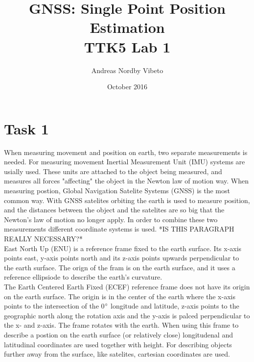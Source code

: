 \documentclass{article}
\title{GNSS: Single Point Position Estimation \\
	   \normalsize{TTK5 Lab 1}}
\author{Andreas Nordby Vibeto}
\date{October 2016}
\begin{document}
\maketitle

\section*{Task 1}

When measuring movement and position on earth, two separate measurements is needed. For measuring movement Inertial Measurement Unit (IMU) systems are usially used. These units are attached to the object being measured, and measures all forces "affecting" the object in the Newton law of motion way. When measuring postion, Global Navigation Satelite Systems (GNSS) is the most common way. With GNSS satelites orbiting the earth is used to measure position, and the distances between the object and the satelites are so big that the Newton's law of motion no longer apply. In order to combine these two measurements different coordinate systems is used. *IS THIS PARAGRAPH REALLY NECESSARY?*\\

East North Up (ENU) is a reference frame fixed to the earth surface. Its x-axis points east, y-axis points north and its z-axis points upwards perpendicular to the earth surface. The orign of the fram is on the earth surface, and it uses a reference ellipsiode to describe the earth's curvature.\\

The Earth Centered Earth Fixed (ECEF) reference frame does not have its origin on the earth surface. The origin is in the center of the earth where the x-axis points to the intersection of the 0$\degree$ longitude and latitude, z-axis points to the geographic north along the rotation axis and the y-axis is palced perpendicular to the x- and z-axis. The frame rotates with the earth. When using this frame to describe a postion on the earth surface (or relatively close) longitudenal and latitudinal coordinates are used together with height. For describing objects further away from the surface, like satelites, cartesian coordinates are used.
\end{document}
